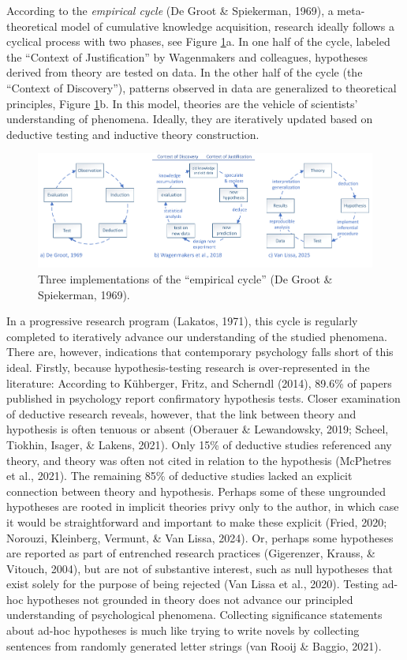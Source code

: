 \documentclass[
  man, noextraspace,floatsintext]{apa6}
\begin{document}
According to the \emph{empirical cycle} (De Groot \& Spiekerman, 1969),
a meta-theoretical model of cumulative knowledge acquisition,
research ideally follows a cyclical process with two phases, see Figure \ref{fig:figecs}a.
In one half of the cycle, labeled the ``Context of Justification'' by Wagenmakers and colleagues, hypotheses derived from theory are tested on data. In the other half of the cycle (the ``Context of Discovery''),
patterns observed in data are generalized to theoretical principles, Figure \ref{fig:figecs}b.
In this model, theories are the vehicle of scientists' understanding of phenomena.
Ideally, they are iteratively updated based on deductive testing and inductive theory construction.

\begin{figure}
\centering
\includegraphics{ec_visio.pdf}
\caption{\label{fig:figecs}Three implementations of the ``empirical cycle'' (De Groot \& Spiekerman, 1969).}
\end{figure}

In a progressive research program (Lakatos, 1971),
this cycle is regularly completed to iteratively advance our understanding of the studied phenomena.
There are, however, indications that contemporary psychology falls short of this ideal.
Firstly, because hypothesis-testing research is over-represented in the literature:
According to Kühberger, Fritz, and Scherndl (2014), 89.6\% of papers published in psychology report confirmatory hypothesis tests.
Closer examination of deductive research reveals, however, that the link between theory and hypothesis is often tenuous or absent (Oberauer \& Lewandowsky, 2019; Scheel, Tiokhin, Isager, \& Lakens, 2021).
Only 15\% of deductive studies referenced any theory, and theory was often not cited in relation to the hypothesis (McPhetres et al., 2021).
The remaining 85\% of deductive studies lacked an explicit connection between theory and hypothesis.
Perhaps some of these ungrounded hypotheses are rooted in implicit theories privy only to the author,
in which case it would be straightforward and important to make these explicit (Fried, 2020; Norouzi, Kleinberg, Vermunt, \& Van Lissa, 2024).
Or, perhaps some hypotheses are reported as part of entrenched research practices (Gigerenzer, Krauss, \& Vitouch, 2004),
but are not of substantive interest, such as null hypotheses that exist solely for the purpose of being rejected (Van Lissa et al., 2020).
Testing ad-hoc hypotheses not grounded in theory does not advance our principled understanding of psychological phenomena.
Collecting significance statements about ad-hoc hypotheses is much like trying to write novels by collecting sentences from randomly generated letter strings (van Rooij \& Baggio, 2021).
\end{document}
